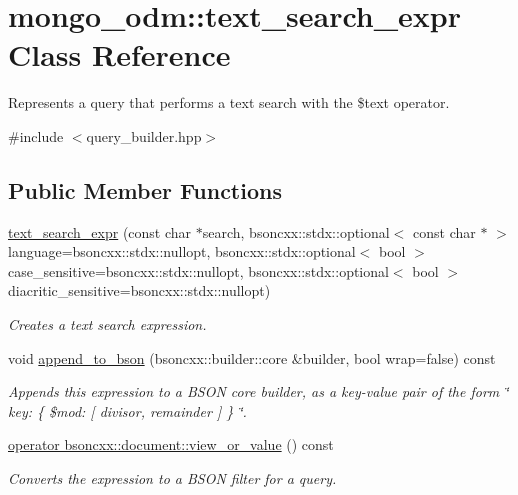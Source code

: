 \hypertarget{classmongo__odm_1_1text__search__expr}{}\section{mongo\+\_\+odm\+:\+:text\+\_\+search\+\_\+expr Class Reference}
\label{classmongo__odm_1_1text__search__expr}


Represents a query that performs a text search with the \$text operator.  




{\ttfamily \#include $<$query\+\_\+builder.\+hpp$>$}

\subsection*{Public Member Functions}
\begin{DoxyCompactItemize}
\item 
\hyperlink{classmongo__odm_1_1text__search__expr_a85bad1931e8642099b913a7fd3118fbe}{text\+\_\+search\+\_\+expr} (const char $\ast$search, bsoncxx\+::stdx\+::optional$<$ const char $\ast$ $>$ language=bsoncxx\+::stdx\+::nullopt, bsoncxx\+::stdx\+::optional$<$ bool $>$ case\+\_\+sensitive=bsoncxx\+::stdx\+::nullopt, bsoncxx\+::stdx\+::optional$<$ bool $>$ diacritic\+\_\+sensitive=bsoncxx\+::stdx\+::nullopt)
\begin{DoxyCompactList}\small\item\em Creates a text search expression. \end{DoxyCompactList}\item 
void \hyperlink{classmongo__odm_1_1text__search__expr_a6e73a334472e7319e34829d4f4014af6}{append\+\_\+to\+\_\+bson} (bsoncxx\+::builder\+::core \&builder, bool wrap=false) const 
\begin{DoxyCompactList}\small\item\em Appends this expression to a B\+S\+ON core builder, as a key-\/value pair of the form \char`\"{} key\+: \{ \$mod\+: \mbox{[} divisor, remainder \mbox{]} \} \char`\"{}. \end{DoxyCompactList}\item 
\hyperlink{classmongo__odm_1_1text__search__expr_a3e95a5dc94a5c60bd41f94ed6e1dac0a}{operator bsoncxx\+::document\+::view\+\_\+or\+\_\+value} () const 
\begin{DoxyCompactList}\small\item\em Converts the expression to a B\+S\+ON filter for a query. \end{DoxyCompactList}\end{DoxyCompactItemize}


